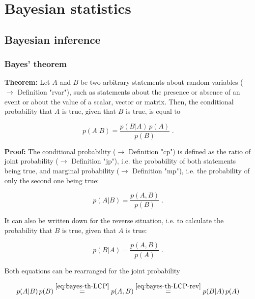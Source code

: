 \documentclass[a4paper,12pt]{book}
\begin{document}
\pagebreak
\section{Bayesian statistics}

\subsection{Bayesian inference}

\subsubsection[\textbf{Bayes' theorem}]{Bayes' theorem} \label{sec:bayes-th}

\vspace{1em}
\textbf{Theorem:} Let $A$ and $B$ be two arbitrary statements about random variables ($\rightarrow$ Definition "rvar"), such as statements about the presence or absence of an event or about the value of a scalar, vector or matrix. Then, the conditional probability that $A$ is true, given that $B$ is true, is equal to

\begin{equation} \label{eq:bayes-th-BT}
p(A|B) = \frac{p(B|A) \, p(A)}{p(B)} \; .
\end{equation}


\vspace{1em}
\textbf{Proof:} The conditional probability ($\rightarrow$ Definition "cp") is defined as the ratio of joint probability ($\rightarrow$ Definition "jp"), i.e. the probability of both statements being true, and marginal probability ($\rightarrow$ Definition "mp"), i.e. the probability of only the second one being true:

\begin{equation} \label{eq:bayes-th-LCP}
p(A|B) = \frac{p(A,B)}{p(B)} \; .
\end{equation}

It can also be written down for the reverse situation, i.e. to calculate the probability that $B$ is true, given that $A$ is true:

\begin{equation} \label{eq:bayes-th-LCP-rev}
p(B|A) = \frac{p(A,B)}{p(A)} \; .
\end{equation}

Both equations can be rearranged for the joint probability

\begin{equation} \label{eq:bayes-th-JP}
p(A|B) \, p(B) \overset{\eqref{eq:bayes-th-LCP}}{=} p(A,B) \overset{\eqref{eq:bayes-th-LCP-rev}}{=} p(B|A) \, p(A)
\end{equation}
\end{document}
